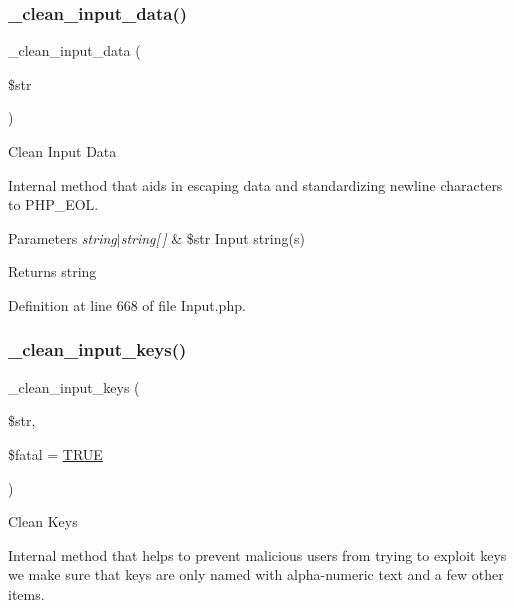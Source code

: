 \subsubsection{\texorpdfstring{\_clean\_input\_data()}{\_clean\_input\_data()}}
{\footnotesize\ttfamily \+\_\+clean\+\_\+input\+\_\+data (\begin{DoxyParamCaption}\item[{}]{\$str }\end{DoxyParamCaption})\hspace{0.3cm}{\ttfamily [protected]}}

Clean Input Data

Internal method that aids in escaping data and standardizing newline characters to P\+H\+P\+\_\+\+E\+OL.


\begin{DoxyParams}{Parameters}
{\em string$\vert$string\mbox{[}$\,$\mbox{]}} & \$str Input string(s) \\
\hline
\end{DoxyParams}
\begin{DoxyReturn}{Returns}
string 
\end{DoxyReturn}


Definition at line 668 of file Input.\+php.

\mbox{\label{class_c_i___input_ac1c5fa9a21372d3dacb1fb99f9418384}} 
\subsubsection{\texorpdfstring{\_clean\_input\_keys()}{\_clean\_input\_keys()}}
{\footnotesize\ttfamily \+\_\+clean\+\_\+input\+\_\+keys (\begin{DoxyParamCaption}\item[{}]{\$str,  }\item[{}]{\$fatal = {\ttfamily \mbox{\hyperlink{constants_8php_ae04a3efe6aa42044f803ee90c2277846}{T\+R\+UE}}} }\end{DoxyParamCaption})\hspace{0.3cm}{\ttfamily [protected]}}

Clean Keys

Internal method that helps to prevent malicious users from trying to exploit keys we make sure that keys are only named with alpha-\/numeric text and a few other items.


